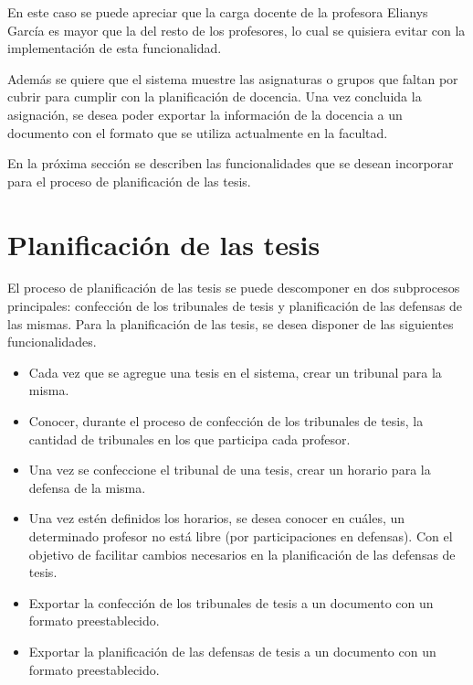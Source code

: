 En este caso se puede apreciar que la carga docente de la profesora 
Elianys García es mayor que la del resto de los profesores, lo cual se 
quisiera evitar con la implementación de esta funcionalidad. 


Además se quiere que el sistema muestre las asignaturas o 
grupos que faltan por cubrir para cumplir con la planificación de docencia. 
Una vez concluida la asignación, se desea poder exportar la información de la docencia a un documento con el 
formato que se utiliza actualmente en la facultad. 







En la próxima sección se describen las funcionalidades que se desean incorporar para el 
proceso de planificación de las tesis.


\section{Planificación de las tesis}\label{tesis:cap2}
El proceso de planificación de las tesis se puede descomponer en dos subprocesos principales: 
confección de los tribunales de tesis y planificación de las defensas de las mismas.
Para la planificación de las tesis, se desea disponer de las siguientes funcionalidades.



\begin{itemize}
    \item Cada vez que se agregue una tesis en el sistema, crear un tribunal para la misma.
    \item Conocer, durante el proceso de confección de los tribunales de tesis, la cantidad de tribunales 
    en los que participa cada profesor.
    \item Una vez se confeccione el tribunal de una tesis, crear un horario para la defensa de la misma.
    \item Una vez estén definidos los horarios, se desea conocer en cuáles, un determinado profesor no está libre (por participaciones en defensas). 
    Con el objetivo de facilitar cambios necesarios en la planificación de las defensas de tesis.  
    \item Exportar la confección de los tribunales de tesis a un documento con un formato preestablecido.
    \item Exportar la planificación de las defensas de tesis a un documento con un formato preestablecido.
\end{itemize}

